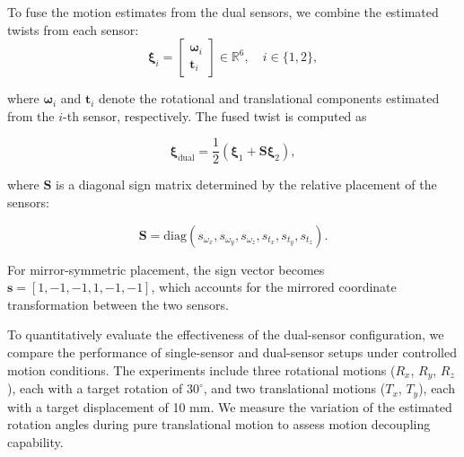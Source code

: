 \documentclass[letterpaper,10pt,journal,twoside]{IEEEtran}
\begin{document}
To fuse the motion estimates from the dual sensors, we combine the estimated twists from each sensor:
\begin{equation}
\boldsymbol{\xi}_i =
\begin{bmatrix}
\boldsymbol{\omega}_i \\
\mathbf{t}_i
\end{bmatrix}
\in \mathbb{R}^6, \quad i \in \{1,2\},
\end{equation}

where $\boldsymbol{\omega}_i$ and $\mathbf{t}_i$ denote the rotational and translational components estimated from the $i$-th sensor, respectively. The fused twist is computed as

\begin{equation}
\boldsymbol{\xi}_{\text{dual}} =
\frac{1}{2}
\left(
\boldsymbol{\xi}_1 +
\mathbf{S} \boldsymbol{\xi}_2
\right),
\end{equation}

where $\mathbf{S}$ is a diagonal sign matrix determined by the relative placement of the sensors:

\begin{equation}
\mathbf{S} =
\text{diag}
\left(
s_{\omega_x},
s_{\omega_y},
s_{\omega_z},
s_{t_x},
s_{t_y},
s_{t_z}
\right).
\end{equation}

For mirror-symmetric placement, the sign vector becomes
$\mathbf{s} = 
\left[
1, -1, -1, 
1, -1, -1
\right]$, 
which accounts for the mirrored coordinate transformation between the two sensors.

To quantitatively evaluate the effectiveness of the dual-sensor configuration, we compare the performance of single-sensor and dual-sensor setups under controlled motion conditions. The experiments include three rotational motions ($R_x$, $R_y$, $R_z$), each with a target rotation of $30^\circ$, and two translational motions ($T_x$, $T_y$), each with a target displacement of 10 mm. We measure the variation of the estimated rotation angles during pure translational motion to assess motion decoupling capability.
\end{document}
